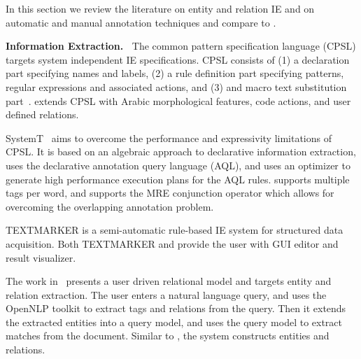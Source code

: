 In this section we review the literature on 
entity and relation IE and on automatic and manual annotation
techniques and compare to \framework.


{\bf Information Extraction.~}
The common pattern specification language (CPSL) targets system independent 
IE specifications. 
CPSL consists of 
(1) a declaration part specifying names and labels, 
(2) a rule definition part specifying patterns, regular expressions and associated actions, and 
(3) and macro text substitution part~\cite{appelt1998common}.
\framework extends CPSL with Arabic morphological features, code actions, and user defined relations.

SystemT~\cite{chiticariu2010systemt}
aims to overcome the performance and expressivity limitations of CPSL.
It is based on an algebraic approach to declarative information extraction,
uses the declarative annotation query language (AQL), and uses
an optimizer to generate high performance execution plans for the AQL rules. 
\framework supports multiple tags per word, and supports the MRE conjunction operator
which allows for overcoming the overlapping annotation problem. 

TEXTMARKER is a semi-automatic rule-based IE system 
for structured data acquisition\cite{atzmueller2008rule}.
Both TEXTMARKER and \framework provide the user with GUI editor and result visualizer. 

The work in~\cite{urbain2012user} presents a user 
driven relational model and targets entity and relation extraction. 
The user enters a natural language query, and uses the OpenNLP toolkit to 
extract tags and relations from the query. 
Then it extends the extracted entities into a query model,
and uses the query model to extract matches from the document. 
Similar to \framework, the system constructs entities and relations. 

